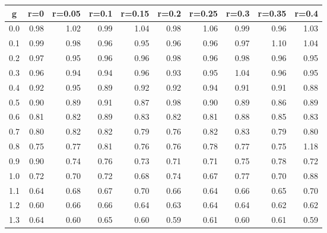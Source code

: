 %
\begin{table}[!tbp]
 \begin{center}
 \begin{tabular}{rrrrrrrrrr}\hline\hline
\multicolumn{1}{c}{g}&\multicolumn{1}{c}{r=0}&\multicolumn{1}{c}{r=0.05}&\multicolumn{1}{c}{r=0.1}&\multicolumn{1}{c}{r=0.15}&\multicolumn{1}{c}{r=0.2}&\multicolumn{1}{c}{r=0.25}&\multicolumn{1}{c}{r=0.3}&\multicolumn{1}{c}{r=0.35}&\multicolumn{1}{c}{r=0.4}\tabularnewline
\hline
0.0&0.98&1.02&0.99&1.04&0.98&1.06&0.99&0.96&1.03\tabularnewline
0.1&0.99&0.98&0.96&0.95&0.96&0.96&0.97&1.10&1.04\tabularnewline
0.2&0.97&0.95&0.96&0.96&0.98&0.96&0.98&0.96&0.95\tabularnewline
0.3&0.96&0.94&0.94&0.96&0.93&0.95&1.04&0.96&0.95\tabularnewline
0.4&0.92&0.95&0.89&0.92&0.92&0.94&0.91&0.91&0.88\tabularnewline
0.5&0.90&0.89&0.91&0.87&0.98&0.90&0.89&0.86&0.89\tabularnewline
0.6&0.81&0.82&0.89&0.83&0.82&0.81&0.88&0.85&0.83\tabularnewline
0.7&0.80&0.82&0.82&0.79&0.76&0.82&0.83&0.79&0.80\tabularnewline
0.8&0.75&0.77&0.81&0.76&0.76&0.78&0.77&0.75&1.18\tabularnewline
0.9&0.90&0.74&0.76&0.73&0.71&0.71&0.75&0.78&0.72\tabularnewline
1.0&0.72&0.70&0.72&0.68&0.74&0.67&0.77&0.70&0.88\tabularnewline
1.1&0.64&0.68&0.67&0.70&0.66&0.64&0.66&0.65&0.70\tabularnewline
1.2&0.60&0.66&0.66&0.64&0.63&0.64&0.64&0.62&0.62\tabularnewline
1.3&0.64&0.60&0.65&0.60&0.59&0.61&0.60&0.61&0.59\tabularnewline
\hline
\end{tabular}

\end{center}

\end{table}

